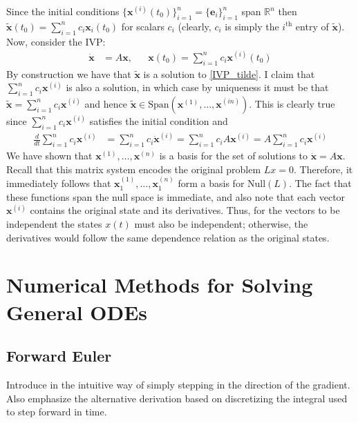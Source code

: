 \documentclass[12pt]{article}
\newcommand{\R}{\mathbb{R}}
\newcommand{\bx}{\mathbf{x}}
\newcommand{\be}{\mathbf{e}}
\begin{document}
 Since the initial conditions $\{\bx^{(i)}(t_0)\}_{i = 1}^{n} = \{\be_i\}_{i = 1}^{n}$ span $\R^n$ then $\tilde{\bx}(t_0) = \sum_{i = 1}^{n} c_i \bx_i(t_0)$ for scalars $c_i$ (clearly, $c_i$ is simply 
 the $i^{\text{th}}$ entry of $\tilde{\bx}$). Now, consider the IVP:
 \begin{align}
 \dot{\bx} &= A\bx, && \bx(t_0) = \sum_{i = 1}^{n} c_i \bx^{(i)}(t_0) \label{IVP_tilde}
 \end{align}
 By construction we have that $\tilde{\bx}$ is a solution to \ref{IVP_tilde}. I claim that $\sum_{i = 1}^{n} c_i \bx^{(i)}$ is also a solution, in which case by uniqueness it must be that 
 $\tilde{\bx} = \sum_{i = 1}^{n} c_i \bx^{(i)}$ and hence $\tilde{\bx} \in \text{Span}\left(\bx^{(1)}, \dots, \bx^{(in)} \right)$. This is clearly true since $\sum_{i = 1}^{n} c_i \bx^{(i)}$ satisfies the initial 
 condition and 
 \begin{align*}
 \frac{d}{dt} \sum_{i = 1}^{n} c_i \bx^{(i)} &= \sum_{i = 1}^{n} c_i \dot{\bx}^{(i)} = \sum_{i = 1}^{n} c_i A\bx^{(i)} = A \sum_{i = 1}^{n} c_i \bx^{(i)} 
 \end{align*}
 We have shown that $\bx^{(1)}, \dots, \bx^{(n)}$ is a basis for the set of solutions to $\dot{\bx} = A\bx$. Recall that this matrix system encodes the original problem $Lx = 0$. Therefore, it 
 immediately follows that $\bx^{(1)}_1, \dots, \bx^{(n)}_1$ form a basis for $\text{Null}(L)$. The fact that these functions span the null space is immediate, and also note that 
 each vector $\bx^{(i)}$ contains the original state and its derivatives. Thus, for the vectors to be independent the states $x(t)$ must also be independent; otherwise, the derivatives 
 would follow the same dependence relation as the original states. 


\section{Numerical Methods for Solving General ODEs}

\subsection{Forward Euler}
Introduce in the intuitive way of simply stepping in the direction of the gradient. Also emphasize the alternative derivation based on discretizing the integral used to 
step forward in time. 
\end{document}
